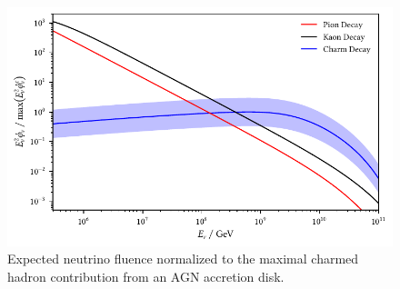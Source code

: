\begin{figure}[H]
	\centering
	\includegraphics{../plots/build/nucleus_neutrino_spectrum.pdf}
	\caption[AGN accretion disk $\nu \kern+0.5pt$ fluence compared to $c$ decay.]
			{Expected neutrino fluence normalized to the maximal charmed hadron contribution from an AGN accretion disk.}
	\label{fig:nucleus-fluence}
\end{figure}
